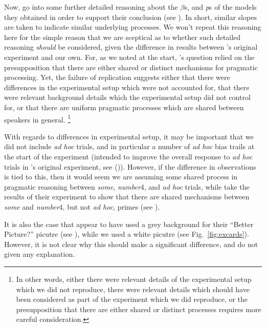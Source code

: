 \documentclass[10pt]{article}
\begin{document}
\begin{multicols}{2}
Now, \citeauthor{Bott:2016aa} go into some further detailed reasoning about the \(\beta\)s, and \emph{p}s of the models they obtained in order to support their conclusion (see \citeyear[126,132--134]{Bott:2016aa}).
In short, similar slopes are taken to indicate similar underlying processes.
We won't repeat this reasoning here for the simple reason that we are sceptical as to whether such detailed reasoning \emph{should} be considered, given the difference in results between \citeauthor{Bott:2016aa}'s original experiment and our own.
For, as we noted at the start, \citeauthor{Bott:2016aa}'s question relied on the presupposition that there are either shared or distinct mechanisms for pragmatic processing.
Yet, the failure of replication suggests either that there were differences in the experimental setup which were not accounted for, that there were relevant background details which the experimental setup did not control for, or that there are uniform pragmatic processes which are shared between speakers in general.\nolinebreak
\footnote{In other words, either there were relevant details of the experimental setup which we did not reproduce, there were relevant details which should have been considered as part of the experiment which we did reproduce, or the presupposition that there are either shared or distinct processes requires more careful consideration.}

With regards to differences in experimental setup, it may be important that we did not include \emph{ad hoc} trials, and in particular a number of \emph{ad hoc} bias trails at the start of the experiment (intended to improve the overall response to \emph{ad hoc} trials in \citeauthor{Bott:2016aa}'s original experiment, see (\citeyear[124]{Bott:2016aa})).
However, if the difference in observations is tied to this, then it would seem we are assuming some shared process in pragmatic reasoning between \emph{some}, \emph{number}4, and \emph{ad hoc} trials, while \citeauthor{Bott:2016aa} take the results of their experiment to show that there are shared mechanisms between \emph{some} and \emph{number}4, but not \emph{ad hoc}, primes (see \citeyear[125--126]{Bott:2016aa}).

It is also the case that \citeauthor{Bott:2016aa} appear to have used a grey background for their ``Better Picture?'' picutre (see \citeyear[Fig.\ 3, 123]{Bott:2016aa}), while we used a white picutre (see Fig.\ \ref{fig:excards}).
However, it is not clear why this should make a significant difference, and \citeauthor{Bott:2016aa} do not given any explanation.


\end{multicols}
\end{document}
